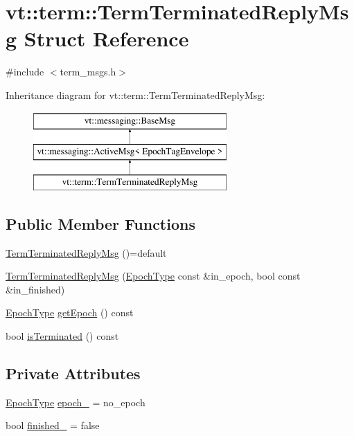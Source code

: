 \hypertarget{structvt_1_1term_1_1_term_terminated_reply_msg}{}\section{vt\+:\+:term\+:\+:Term\+Terminated\+Reply\+Msg Struct Reference}
\label{structvt_1_1term_1_1_term_terminated_reply_msg}


{\ttfamily \#include $<$term\+\_\+msgs.\+h$>$}

Inheritance diagram for vt\+:\+:term\+:\+:Term\+Terminated\+Reply\+Msg\+:\begin{figure}[H]
\begin{center}
\leavevmode
\includegraphics[height=3.000000cm]{structvt_1_1term_1_1_term_terminated_reply_msg}
\end{center}
\end{figure}
\subsection*{Public Member Functions}
\begin{DoxyCompactItemize}
\item 
\hyperlink{structvt_1_1term_1_1_term_terminated_reply_msg_ae20713dfddff3aa2e2d17a98b0dd8b9d}{Term\+Terminated\+Reply\+Msg} ()=default
\item 
\hyperlink{structvt_1_1term_1_1_term_terminated_reply_msg_ab59aabefa4f4bf9abb1e60433066a1ac}{Term\+Terminated\+Reply\+Msg} (\hyperlink{namespacevt_a985a5adf291c34a3ca263b3378388236}{Epoch\+Type} const \&in\+\_\+epoch, bool const \&in\+\_\+finished)
\item 
\hyperlink{namespacevt_a985a5adf291c34a3ca263b3378388236}{Epoch\+Type} \hyperlink{structvt_1_1term_1_1_term_terminated_reply_msg_a698733a686553c57a4da26f72fdfb9ab}{get\+Epoch} () const
\item 
bool \hyperlink{structvt_1_1term_1_1_term_terminated_reply_msg_abbac7b1c9254980d0d0c25e1959a6976}{is\+Terminated} () const
\end{DoxyCompactItemize}
\subsection*{Private Attributes}
\begin{DoxyCompactItemize}
\item 
\hyperlink{namespacevt_a985a5adf291c34a3ca263b3378388236}{Epoch\+Type} \hyperlink{structvt_1_1term_1_1_term_terminated_reply_msg_a2e52a9c6dbc4156dba189704265773c6}{epoch\+\_\+} = no\+\_\+epoch
\item 
bool \hyperlink{structvt_1_1term_1_1_term_terminated_reply_msg_a7d5f6264f595981386a08aefee4178f1}{finished\+\_\+} = false
\end{DoxyCompactItemize}
